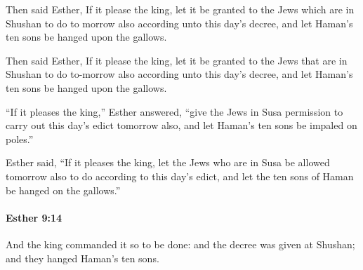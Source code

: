 			Then said Esther, If it please the king, let it be granted to the Jews which are in Shushan to do to morrow also according unto this day’s decree, and let Haman’s ten sons be hanged upon the gallows.

			\begin{versebox}
					\item[BHS] 
					\item[LXX] 
					\item[ASV] Then said Esther, If it please the king, let it be granted to the Jews that are in Shushan to do to-morrow also according unto this day's decree, and let Haman's ten sons be hanged upon the gallows.
					\item[NIV] “If it pleases the king,” Esther answered, “give the Jews in Susa permission to carry out this day’s edict tomorrow also, and let Haman’s ten sons be impaled on poles.”
					\item[NRSV] Esther said, “If it pleases the king, let the Jews who are in Susa be allowed tomorrow also to do according to this day’s edict, and let the ten sons of Haman be hanged on the gallows.”
			\end{versebox}

		\paragraph{Esther 9:14} %
			\label{ESTHER-9-14}

			And the king commanded it so to be done: and the decree was given at Shushan; and they hanged Haman’s ten sons.

